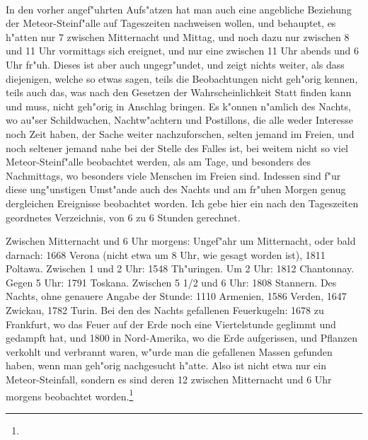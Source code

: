 \documentclass[a4paper, 11pt, oneside, polutonikogreek, german]{article}
\begin{document}
\paragraph{}
In den vorher angef"uhrten Aufs"atzen hat man auch eine angebliche Beziehung der Meteor-Steinf"alle auf Tageszeiten nachweisen wollen, und behauptet, es h"atten nur 7 zwischen Mitternacht und Mittag, und noch dazu nur zwischen 8 und 11 Uhr vormittags sich ereignet, und nur eine zwischen 11 Uhr abends und 6 Uhr fr"uh. Dieses ist aber auch ungegr"undet, und zeigt nichts weiter, als dass diejenigen, welche so etwas sagen, teils die Beobachtungen nicht geh"orig kennen, teils auch das, was nach den Gesetzen der Wahrscheinlichkeit Statt finden kann und muss, nicht geh"orig in Anschlag bringen. Es k"onnen n"amlich des Nachts, wo au"ser Schildwachen, Nachtw"achtern und Postillons, die alle weder Interesse noch Zeit haben, der Sache weiter nachzuforschen, selten jemand im Freien, und noch seltener jemand nahe bei der Stelle des Falles ist, bei weitem nicht so viel Meteor-Steinf"alle beobachtet werden, als am Tage, und besonders des Nachmittags, wo besonders viele Menschen im Freien sind. Indessen sind f"ur diese ung"unstigen Umst"ande auch des Nachts und am fr"uhen Morgen genug dergleichen Ereignisse beobachtet worden. Ich gebe hier ein nach den Tageszeiten geordnetes Verzeichnis, von 6 zu 6 Stunden gerechnet.

Zwischen Mitternacht und 6 Uhr morgens: Ungef"ahr um Mitternacht, oder bald darnach: 1668 Verona (nicht etwa um 8 Uhr, wie gesagt worden ist), 1811 Poltawa. Zwischen 1 und 2 Uhr: 1548 Th"uringen. Um 2 Uhr: 1812 Chantonnay. Gegen 5 Uhr: 1791 Toskana. Zwischen 5 1/2 und 6 Uhr: 1808 Stannern. Des Nachts, ohne genauere Angabe der Stunde: 1110 Armenien, 1586 Verden, 1647 Zwickau, 1782 Turin. Bei den des Nachts gefallenen Feuerkugeln: 1678 zu Frankfurt, wo das Feuer auf der Erde noch eine Viertelstunde geglimmt und gedampft hat, und 1800 in Nord-Amerika, wo die Erde aufgerissen, und Pflanzen verkohlt und verbrannt waren, w"urde man die gefallenen Massen gefunden haben, wenn man geh"orig nachgesucht h"atte. Also ist nicht etwa nur ein Meteor-Steinfall, sondern es sind deren 12 zwischen Mitternacht und 6 Uhr morgens beobachtet worden.\footnote{}
\end{document}
